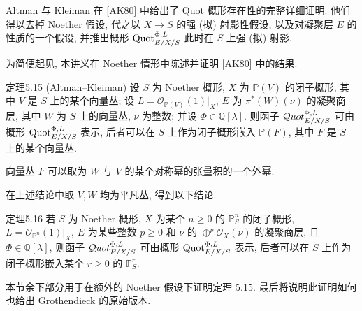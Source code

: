 Altman 与 Kleiman 在 [AK80] 中给出了 Quot 概形存在性的完整详细证明. 他们得以去掉 Noether 假设, 代之以 $X\to S$ 的强 (拟) 射影性假设, 以及对凝聚层 $E$ 的性质的一个假设, 并推出概形 $\operatorname{Quot}^{\Phi,L}_{E/X/S}$ 此时在 $S$ 上强 (拟) 射影.

为简便起见, 本讲义在 Noether 情形中陈述并证明 [AK80] 中的结果.
\begin{origstatement}{定理}{5.15}\label{ch05:thm5.15}
(Altman--Kleiman) 设 $S$ 为 Noether 概形, $X$ 为 $\mathbb P(V)$ 的闭子概形, 其中 $V$ 是 $S$ 上的某个向量丛; 设 $L=\mathcal O_{\mathbb P(V)}(1)|_X$, $E$ 为 $\pi^*(W)(\nu)$ 的凝聚商层, 其中 $W$ 为 $S$ 上的向量丛, $\nu$ 为整数; 并设 $\Phi\in\mathbb Q[\lambda]$. 则函子 $\mathcal{Q}uot^{\Phi,L}_{E/X/S}$ 可由概形 $\operatorname{Quot}^{\Phi,L}_{E/X/S}$ 表示, 后者可以在 $S$ 上作为闭子概形嵌入 $\mathbb P(F)$, 其中 $F$ 是 $S$ 上的某个向量丛.

向量丛 $F$ 可以取为 $W$ 与 $V$ 的某个对称幂的张量积的一个外幂.
\end{origstatement}

在上述结论中取 $V,W$ 均为平凡丛, 得到以下结论.
\begin{origstatement}{定理}{5.16}\label{ch05:thm5.16}
若 $S$ 为 Noether 概形, $X$ 为某个 $n\geq0$ 的 $\mathbb P^n_S$ 的闭子概形, $L=\mathcal O_{\mathbb P^n}(1)|_X$, $E$ 为某些整数 $p\geq0$ 和 $\nu$ 的 $\oplus^p\mathcal O_X(\nu)$ 的凝聚商层, 且 $\Phi\in\mathbb Q[\lambda]$, 则函子 $\mathcal{Q}uot^{\Phi,L}_{E/X/S}$ 可由概形 $\operatorname{Quot}^{\Phi,L}_{E/X/S}$ 表示, 后者可以在 $S$ 上作为闭子概形嵌入某个 $r\geq0$ 的 $\mathbb P^r_S$.
\end{origstatement}

本节余下部分用于在额外的 Noether 假设下证明定理 5.15. 最后将说明此证明如何也给出 Grothendieck 的原始版本.

